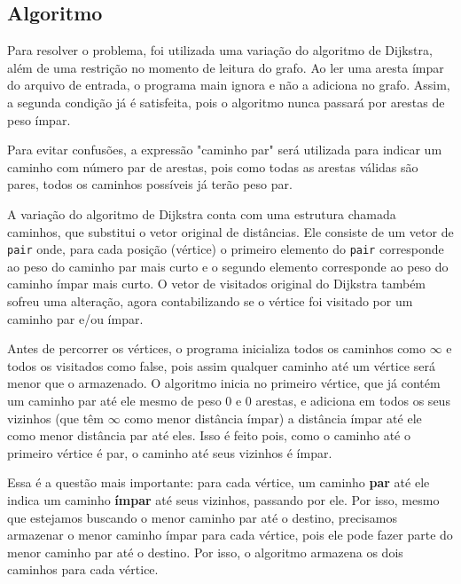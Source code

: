 \documentclass[12pt]{article}
\begin{document}
	\subsection*{Algoritmo}
		
		\par Para resolver o problema, foi utilizada uma variação do algoritmo de Dijkstra, além de uma restrição no momento de leitura do grafo. Ao ler uma aresta ímpar do arquivo de entrada, o programa main ignora e não a adiciona no grafo. Assim, a segunda condição já é satisfeita, pois o algoritmo nunca passará por arestas de peso ímpar.

		\par Para evitar confusões, a expressão "caminho par" será utilizada para indicar um caminho com número par de arestas, pois como todas as arestas válidas são pares, todos os caminhos possíveis já terão peso par.
		
		\par A variação do algoritmo de Dijkstra conta com uma estrutura chamada caminhos, que substitui o vetor original de distâncias. Ele consiste de um vetor de \texttt{pair} onde, para cada posição (vértice) o primeiro elemento do \texttt{pair} corresponde ao peso do caminho par mais curto e o segundo elemento corresponde ao peso do caminho ímpar mais curto. O vetor de visitados original do Dijkstra também sofreu uma alteração, agora contabilizando se o vértice foi visitado por um caminho par e/ou ímpar.

		\par Antes de percorrer os vértices, o programa inicializa todos os caminhos como $\infty$ e todos os visitados como false, pois assim qualquer caminho até um vértice será menor que o armazenado. O algoritmo inicia no primeiro vértice, que já contém um caminho par até ele mesmo de peso 0 e 0 arestas, e adiciona em todos os seus vizinhos (que têm $\infty$ como menor distância ímpar) a distância ímpar até ele como menor distância par até eles. Isso é feito pois, como o caminho até o primeiro vértice é par, o caminho até seus vizinhos é ímpar.
		
		\par Essa é a questão mais importante: para cada vértice, um caminho \textbf{par} até ele indica um caminho \textbf{ímpar} até seus vizinhos, passando por ele. Por isso, mesmo que estejamos buscando o menor caminho par até o destino, precisamos armazenar o menor caminho ímpar para cada vértice, pois ele pode fazer parte do menor caminho par até o destino. Por isso, o algoritmo armazena os dois caminhos para cada vértice.
\end{document}
